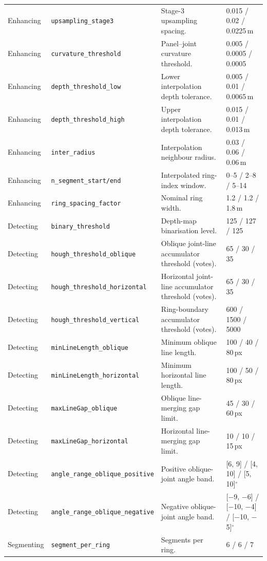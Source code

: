 \documentclass[a4paper,fleqn]{cas-dc}
\begin{document}
\begin{table}[t]
\begin{tabular*}{\textwidth}{@{\extracolsep{\fill}} l l Y{0.30\textwidth} l @{}}
Enhancing & \texttt{upsampling\_stage3} & Stage-3 upsampling spacing. & 0.015 / 0.02 / 0.0225\,m \\
Enhancing & \texttt{curvature\_threshold} & Panel--joint curvature threshold. & 0.005 / 0.0005 / 0.0005 \\
Enhancing & \texttt{depth\_threshold\_low} & Lower interpolation depth tolerance. & 0.005 / 0.01 / 0.0065\,m \\
Enhancing & \texttt{depth\_threshold\_high} & Upper interpolation depth tolerance. & 0.015 / 0.01 / 0.013\,m \\
Enhancing & \texttt{inter\_radius} & Interpolation neighbour radius. & 0.03 / 0.06 / 0.06\,m \\
Enhancing & \texttt{n\_segment\_start/end} & Interpolated ring-index window. & 0--5 / 2--8 / 5--14 \\
Enhancing & \texttt{ring\_spacing\_factor} & Nominal ring width. & 1.2 / 1.2 / 1.8\,m \\
\midrule
Detecting & \texttt{binary\_threshold} & Depth-map binarisation level. & 125 / 127 / 125 \\
Detecting & \texttt{hough\_threshold\_oblique} & Oblique joint-line accumulator threshold (votes). & 65 / 30 / 35 \\
Detecting & \texttt{hough\_threshold\_horizontal} & Horizontal joint-line accumulator threshold (votes). & 65 / 30 / 35 \\
Detecting & \texttt{hough\_threshold\_vertical} & Ring-boundary accumulator threshold (votes). & 600 / 1500 / 5000 \\
Detecting & \texttt{minLineLength\_oblique} & Minimum oblique line length. & 100 / 40 / 80\,px \\
Detecting & \texttt{minLineLength\_horizontal} & Minimum horizontal line length. & 100 / 50 / 80\,px \\
Detecting & \texttt{maxLineGap\_oblique} & Oblique line-merging gap limit. & 45 / 30 / 60\,px \\
Detecting & \texttt{maxLineGap\_horizontal} & Horizontal line-merging gap limit. & 10 / 10 / 15\,px \\
Detecting & \texttt{angle\_range\_oblique\_positive} & Positive oblique-joint angle band. & [6, 9] / [4, 10] / [5, 10]$^{\circ}$ \\
Detecting & \texttt{angle\_range\_oblique\_negative} & Negative oblique-joint angle band. & [$-$9, $-$6] / [$-$10, $-$4] / [$-$10, $-$5]$^{\circ}$ \\
\midrule
Segmenting & \texttt{segment\_per\_ring} & Segments per ring. & 6 / 6 / 7 \\

\end{tabular*}
\end{table}
\end{document}
